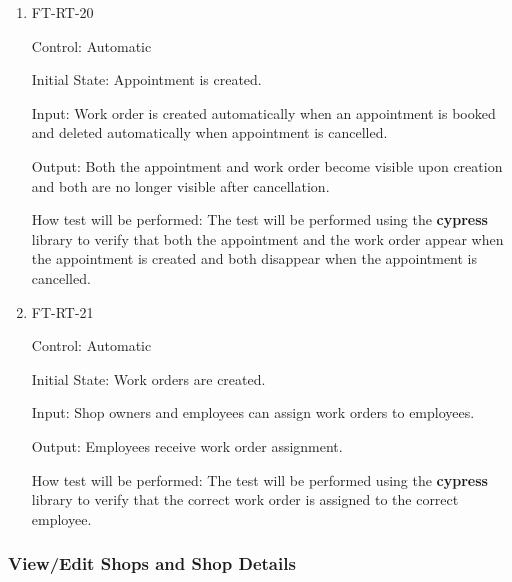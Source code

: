 \documentclass[12pt, titlepage]{article}
\begin{document}
\begin{enumerate}
\item{FT-RT-20\\}

Control: Automatic

Initial State: Appointment is created.

Input: Work order is created automatically when an appointment is booked and deleted automatically when appointment is cancelled.

Output: Both the appointment and work order become visible upon creation and both are no longer visible after cancellation.

How test will be performed: The test will be performed using the \textbf{cypress} library to verify that both the appointment and the work order appear when the appointment is created and both disappear when the appointment is cancelled.

\item{FT-RT-21\\}

Control: Automatic

Initial State: Work orders are created.

Input: Shop owners and employees can assign work orders to employees.

Output: Employees receive work order assignment.

How test will be performed: The test will be performed using the \textbf{cypress} library to verify that the correct work order is assigned to the correct employee.

\end{enumerate}

\subsubsection{View/Edit Shops and Shop Details}
\end{document}
